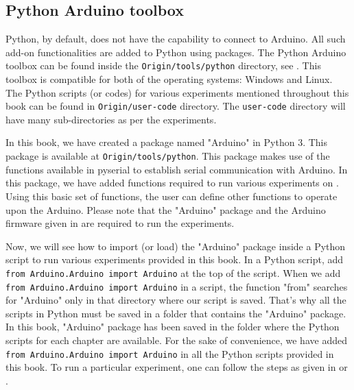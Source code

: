 



\subsection{Python Arduino toolbox}
Python, by default, does not have the capability to connect to Arduino. 
All such add-on functionalities are added to Python using packages. 
The Python Arduino toolbox can be found inside the {\tt Origin/tools/python} directory, 
see .  This toolbox is compatible for both of the operating systems: Windows and Linux. 
The Python scripts (or codes) for various experiments mentioned throughout this book can be found in 
{\tt Origin/user-code} directory. The {\tt user-code} directory will have many sub-directories as per the experiments. 

In this book, we have created a package named "Arduino" in Python 3.  This package is available at 
{\tt Origin/tools/python}. This package makes use of the functions available in pyserial \cite{pySerial} to 
establish serial communication with Arduino. In this package, we have added functions required to run 
various experiments on \arduino. Using this basic set of functions, the user can define other functions to operate
upon the Arduino. Please note that the "Arduino" package and the Arduino firmware  given 
in  are required to run the experiments. 

Now, we will see how to import (or load) the "Arduino" package inside a Python script to run 
various experiments provided in this book. In a Python script, add {\tt from Arduino.Arduino import Arduino} 
at the top of the script. When we add {\tt from Arduino.Arduino import Arduino} in a script, the function "from" 
searches for "Arduino" only in that directory where our script is saved. That's why all the scripts in Python 
must be saved in a folder that contains the "Arduino" package. In this book, "Arduino" package has been saved 
in the folder where the Python scripts for each chapter are available. For the sake of convenience, we have 
added {\tt from Arduino.Arduino import Arduino} in all the Python scripts provided in this book. 
To run a particular experiment, one can follow the steps as given in  or . 


